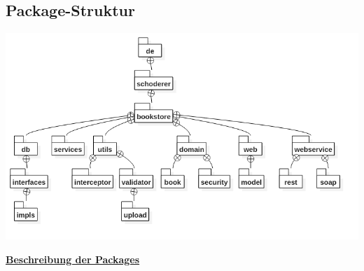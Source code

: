 \documentclass[12pt,a4paper]{book}
\begin{document}
		\subsection{Package-Struktur}
		\begin{center}
		\includegraphics[width=1\textwidth]{Images/package.png}
		\label{fig1}
	\end{center}
	\underline{\textbf{Beschreibung der Packages}}
\end{document}
